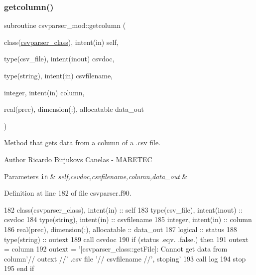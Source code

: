 \subsubsection{\texorpdfstring{getcolumn()}{getcolumn()}}
{\footnotesize\ttfamily subroutine csvparser\+\_\+mod\+::getcolumn (\begin{DoxyParamCaption}\item[{class(\mbox{\hyperlink{structcsvparser__mod_1_1csvparser__class}{csvparser\+\_\+class}}), intent(in)}]{self,  }\item[{type(csv\+\_\+file), intent(inout)}]{csvdoc,  }\item[{type(string), intent(in)}]{csvfilename,  }\item[{integer, intent(in)}]{column,  }\item[{real(prec), dimension(\+:), allocatable}]{data\+\_\+out }\end{DoxyParamCaption})\hspace{0.3cm}{\ttfamily [private]}}



Method that gets data from a column of a .csv file. 

\begin{DoxyAuthor}{Author}
Ricardo Birjukovs Canelas -\/ M\+A\+R\+E\+T\+EC 
\end{DoxyAuthor}

\begin{DoxyParams}[1]{Parameters}
\mbox{\tt in}  & {\em self,csvdoc,csvfilename,column,data\+\_\+out} & \\
\hline
\end{DoxyParams}


Definition at line 182 of file csvparser.\+f90.


\begin{DoxyCode}
182     \textcolor{keywordtype}{class}(csvparser\_class), \textcolor{keywordtype}{intent(in)} :: self
183     \textcolor{keywordtype}{type}(csv\_file), \textcolor{keywordtype}{intent(inout)} :: csvdoc
184     \textcolor{keywordtype}{type}(string), \textcolor{keywordtype}{intent(in)} :: csvfilename
185     \textcolor{keywordtype}{integer}, \textcolor{keywordtype}{intent(in)} :: column
186     \textcolor{keywordtype}{real(prec)}, \textcolor{keywordtype}{dimension(:)}, \textcolor{keywordtype}{allocatable} :: data\_out
187     \textcolor{keywordtype}{logical} :: status
188     \textcolor{keywordtype}{type}(string) :: outext
189     \textcolor{keyword}{call }csvdoc%
190     \textcolor{keywordflow}{if} (status .eqv. .false.) \textcolor{keywordflow}{then}
191         outext = column
192         outext = \textcolor{stringliteral}{'[csvparser\_class::getFile]: Cannot get data from column'}// outext //\textcolor{stringliteral}{' .csv file '}// 
      csvfilename //\textcolor{stringliteral}{', stoping'}
193         \textcolor{keyword}{call }log%
194         stop
195 \textcolor{keywordflow}{    end if}
\end{DoxyCode}
\mbox{\label{namespacecsvparser__mod_aa7dbe42af8b97daccf58fc7be9939f60}} 
